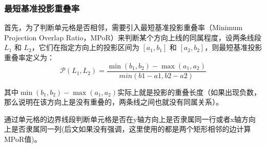 \documentclass[number, UTF8,12pt, AutoFakeBold,fontset = founder]{ctexart}
\begin{document}
\subsubsection{最短基准投影重叠率}
首先，为了判断单元格是否相邻，需要引入最短基准投影重叠率（Minimum Projection Overlap Ratio，MPoR）来判断某个方向上线的同属程度，设两条线段 \( L_1 \) 和 \( L_2 \)，它们在指定方向上的投影区间为 \([a_1, b_1]\) 和 \([a_2, b_2]\)，则最短基准投影重叠率定义为：
\begin{equation}
    \mathcal{P}(L_1,L_2) = \frac{\min(b_1, b_2) - \max(a_1, a_2)}{min(b1-a1, b2-a2)}
\label{eq:piol}
\end{equation}


其中$\min(b_1, b_2) - \max(a_1, a_2)$实际上就是投影的重叠长度（如果出现负数，那么说明在该方向上是没有重叠的，两条线之间也就没有同属关系）。

通过单元格的边界线段判断单元格是否在y轴方向上是否隶属同一行或者x轴方向上是否隶属同一列(后文如果没有强调，这里使用的都是两个矩形相邻的边计算MPoR值)。
\end{document}
